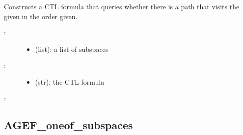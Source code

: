 \documentclass[letterpaper,10pt,english]{sphinxmanual}
\begin{document}
\begin{fulllineitems}
\label{\detokenize{QueryPatterns:PyBoolNet.QueryPatterns.EF_nested_reachability}}
Constructs a CTL formula that queries whether there is a path that visits the given  in the order given.
\begin{description}
\item[{:}] \leavevmode\begin{itemize}
\item {} 
 (list): a list of subspaces

\end{itemize}

\item[{:}] \leavevmode\begin{itemize}
\item {} 
 (str): the CTL formula

\end{itemize}

\end{description}

:

\begin{sphinxVerbatim}[commandchars=\\\{\}]
  \PYG{p}{[} \PYG{p}{]}
\end{sphinxVerbatim}

\end{fulllineitems}



\subsection{AGEF\_oneof\_subspaces}
\label{\detokenize{QueryPatterns:agef-oneof-subspaces}}
\end{document}

